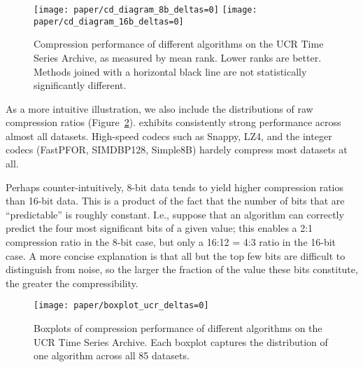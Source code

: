 \begin{figure}[h]
\begin{center}
    \texttt{[image: paper/cd\_diagram\_8b\_deltas=0]}
    \texttt{[image: paper/cd\_diagram\_16b\_deltas=0]}
    \caption{Compression performance of different algorithms on the UCR Time Series Archive, as measured by mean rank. Lower ranks are better. Methods joined with a horizontal black line are not statistically significantly different.}
    \label{fig:ratioCD}
\end{center}
\end{figure}

As a more intuitive illustration, we also include the distributions of raw compression ratios (Figure~\ref{fig:ratioBox}). \minesp exhibits consistently strong performance across almost all datasets. High-speed codecs such as Snappy, LZ4, and the integer codecs (FastPFOR, SIMDBP128, Simple8B) hardely compress most datasets at all.

Perhaps counter-intuitively, 8-bit data tends to yield higher compression ratios than 16-bit data. This is a product of the fact that the number of bits that are ``predictable'' is roughly constant. I.e., suppose that an algorithm can correctly predict the four most significant bits of a given value; this enables a 2:1 compression ratio in the 8-bit case, but only a 16:12 = 4:3 ratio in the 16-bit case. A more concise explanation is that all but the top few bits are difficult to distinguish from noise, so the larger the fraction of the value these bits constitute, the greater the compressibility.

\begin{figure}[h]
\begin{center}
    \texttt{[image: paper/boxplot\_ucr\_deltas=0]}
    \caption{Boxplots of compression performance of different algorithms on the UCR Time Series Archive. Each boxplot captures the distribution of one algorithm across all 85 datasets.}
    \label{fig:ratioBox}
\end{center}
\end{figure}


